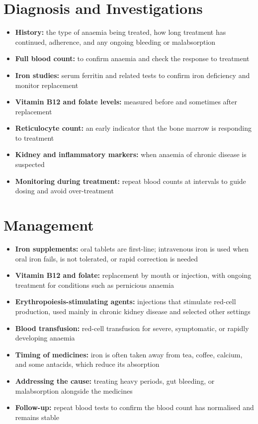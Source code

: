 \section*{Diagnosis and Investigations}
\begin{itemize}
    \item \textbf{History:} the type of anaemia being treated, how long treatment has continued, adherence, and any ongoing bleeding or malabsorption
    \item \textbf{Full blood count:} to confirm anaemia and check the response to treatment
    \item \textbf{Iron studies:} serum ferritin and related tests to confirm iron deficiency and monitor replacement
    \item \textbf{Vitamin B12 and folate levels:} measured before and sometimes after replacement
    \item \textbf{Reticulocyte count:} an early indicator that the bone marrow is responding to treatment
    \item \textbf{Kidney and inflammatory markers:} when anaemia of chronic disease is suspected
    \item \textbf{Monitoring during treatment:} repeat blood counts at intervals to guide dosing and avoid over-treatment
\end{itemize}

\section*{Management}
\begin{itemize}
    \item \textbf{Iron supplements:} oral tablets are first-line; intravenous iron is used when oral iron fails, is not tolerated, or rapid correction is needed
    \item \textbf{Vitamin B12 and folate:} replacement by mouth or injection, with ongoing treatment for conditions such as pernicious anaemia
    \item \textbf{Erythropoiesis-stimulating agents:} injections that stimulate red-cell production, used mainly in chronic kidney disease and selected other settings
    \item \textbf{Blood transfusion:} red-cell transfusion for severe, symptomatic, or rapidly developing anaemia
    \item \textbf{Timing of medicines:} iron is often taken away from tea, coffee, calcium, and some antacids, which reduce its absorption
    \item \textbf{Addressing the cause:} treating heavy periods, gut bleeding, or malabsorption alongside the medicines
    \item \textbf{Follow-up:} repeat blood tests to confirm the blood count has normalised and remains stable
\end{itemize}

